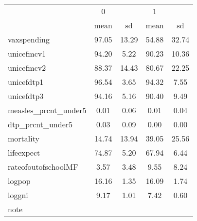 \begin{tabular}{l*{2}{cc}}
\hline\hline
            &           0&            &           1&            \\
            &        mean&          sd&        mean&          sd\\
\hline
vaxspending &       97.05&       13.29&       54.88&       32.74\\
unicefmcv1  &       94.20&        5.22&       90.23&       10.36\\
unicefmcv2  &       88.37&       14.43&       80.67&       22.25\\
unicefdtp1  &       96.54&        3.65&       94.32&        7.55\\
unicefdtp3  &       94.16&        5.16&       90.40&        9.49\\
measles\_prcnt\_under5&        0.01&        0.06&        0.01&        0.04\\
dtp\_prcnt\_under5&        0.03&        0.09&        0.00&        0.00\\
mortality   &       14.74&       13.94&       39.05&       25.56\\
lifeexpect  &       74.87&        5.20&       67.94&        6.44\\
rateofoutofschoolMF&        3.57&        3.48&        9.55&        8.24\\
logpop      &       16.16&        1.35&       16.09&        1.74\\
loggni      &        9.17&        1.01&        7.42&        0.60\\
\hline\hline
\multicolumn{5}{l}{\footnotesize note}\\
\end{tabular}
